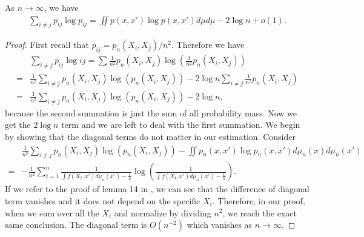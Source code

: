 \begin{lemma} \label{entropy_lemma_1}
    As $n \to \infty$, we have
    \begin{align}
        \sum_{i \neq j} p_{ij} \log p_{ij} = \iint p(x,x')\log p(x,x')d\mu d\mu - 2 \log n + o(1).
    \end{align}
\end{lemma}
\begin{proof}
    First recall that $p_{ij} = p_n(X_i,X_j)/n^2$. Therefore we have
    \begin{align}
          & \sum_{i \neq j}p_{ij} \log{ij} = \sum \frac{1}{n^2}p_n(X_i,X_j)\log\left(\frac{1}{n^2}p_n(X_i,X_j)\right) \nonumber           \\
        = & \frac{1}{n^2} \sum_{i \neq j} p_n(X_i,X_j) \log (p_n(X_i,X_j)) - 2 \log n\sum_{i \neq j} \frac{1}{n^2} p_n(X_i,X_j) \nonumber \\
        = & \frac{1}{n^2} \sum_{i \neq j} p_n(X_i,X_j) \log (p_n(X_i,X_j)) - 2 \log n,
    \end{align}
    because the second summation is just the sum of all probability mass. Now we get the $2 \log n$ term and we are left to deal with the first summation. We begin by showing that the diagonal terms do not matter in our estimation. Consider
    \begin{align}
          & \frac{1}{n^2} \sum_{i \neq j} p_n(X_i,X_j) \log (p_n(X_i,X_j)) - \iint p_n(x,x')\log p_n(x,x') d\mu_n(x)d\mu_n(x') \nonumber                     \\
        = & - \frac{1}{n^2}\sum_{t=1}^{n} \frac{1}{\int f(X_t,x')d\mu_n(x') - \frac{1}{n}}\log\left(\frac{1}{\int f(X_t,x')d\mu_n(x') - \frac{1}{n}}\right).
    \end{align}
    If we refer to the proof of lemma 14 in \cite{auffinger-tsne}, we can see that the difference of diagonal term vanishes and it does not depend on the specific $X_i$. Therefore, in our proof, when we sum over all the $X_i$ and normalize by dividing $n^2$, we reach the exact same conclusion. The diagonal term is $O(n^{-2})$ which vanishes as $n \to \infty$.


\end{proof}
